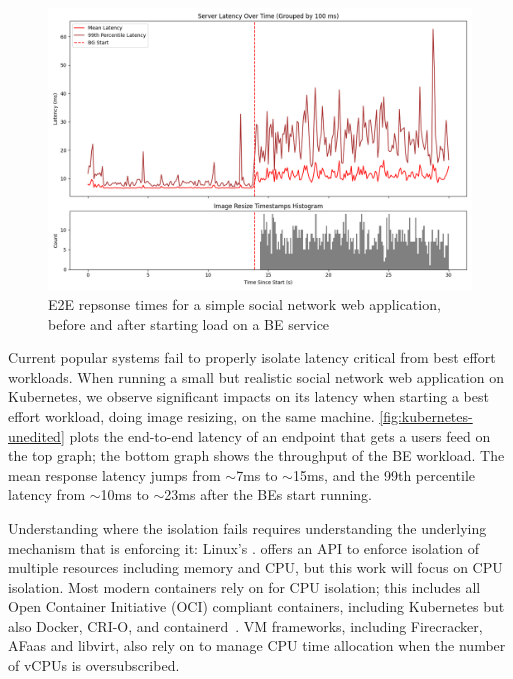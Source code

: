 \begin{figure}[t]
    \centering
    \includegraphics[width=\columnwidth]{graphs/kubernetes-unedited.png}
    \caption{E2E repsonse times for a simple social network web application,
    before and after starting load on a BE
    service}\label{fig:kubernetes-unedited}
\end{figure}

Current popular systems fail to properly isolate latency critical from best
effort workloads. When running a small but realistic social network web
application on Kubernetes, we observe significant impacts on its latency when
starting a best effort workload, doing image resizing, on the same machine.
\autoref{fig:kubernetes-unedited} plots the end-to-end latency of an endpoint
that gets a users feed on the top graph; the bottom graph shows the throughput
of the BE workload. The mean response latency jumps from $\sim$7ms to
$\sim$15ms, and the 99th percentile latency from $\sim$10ms to $\sim$23ms after
the BEs start running. 

Understanding where the isolation fails requires understanding the underlying
mechanism that is enforcing it: Linux's \cgroups{}. \cgroups{} offers an API to
enforce isolation of multiple resources including memory and CPU, but this work
will focus on CPU isolation. Most modern containers rely on \cgroups{} for CPU
isolation; this includes all Open Container Initiative (OCI) compliant
containers, including Kubernetes but also Docker, CRI-O, and
containerd~\cite{oci-cgroups,docker-docs-cgroups,container-isolation-article}.
VM frameworks, including Firecracker, AFaas and libvirt, also rely on \cgroups{}
to manage CPU time allocation when the number of vCPUs is
oversubscribed.~\cite{firecracker-cgroups,afaas,libvirt-cgroups}


